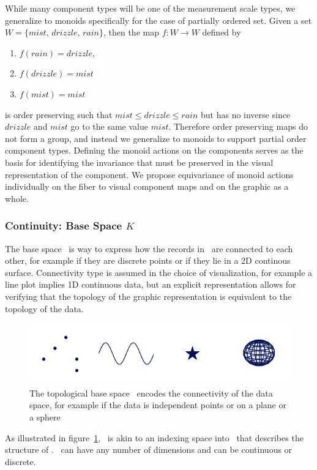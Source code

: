 \documentclass[../main.tex]{subfiles}
\begin{document}
While many component types will be one of the measurement scale types, we generalize to monoids specifically for the case of partially ordered set. Given a set $W=\{mist, \, drizzle, \, rain \}$, then the map $f: W\rightarrow W$ defined by 
\begin{enumerate}
    \item $f(rain) = drizzle$,
    \item  $f(drizzle) = mist$ 
    \item $f(mist) = mist$
\end{enumerate}
is order preserving such that $mist \leq drizzle \leq rain$ but has no inverse since $drizzle$ and $mist$ go to the same value $mist$. Therefore order preserving maps do not form a group, and instead we generalize to monoids to support partial order component types. Defining the monoid actions on the components serves as the basis for identifying the invariance\cite{kindlmann2014algebraic} that must be preserved in the visual representation of the component. We propose equivariance of monoid actions individually on the fiber to visual component maps and on the graphic as a whole.

\subsubsection{Continuity: Base Space $K$} 
\label{sec:data_base}
The base space \dbase\ is way to express how the records in \dtotal\ are connected to each other, for example if they are discrete points or if they lie in a 2D continous surface. Connectivity type is assumed in the choice of visualization, for example a line plot implies 1D continuous data, but an explicit representation allows for verifying that the topology of the graphic representation is equivalent to the topology of the data.  

\begin{figure}[H]
    \includegraphics[width=1\textwidth]{figures/math/k_different_types.png}
    \caption{The topological base space \dbase\ encodes the connectivity of the data space, for example if the data is independent points or on a plane or a sphere}
    \label{fig:base_space_types}
\end{figure}
As illustrated in figure~\ref{fig:base_space_types}, \dbase\ is akin to an indexing space into \dtotal\ that describes the structure of \dtotal.  \dbase\ can have any number of dimensions and can be continuous or discrete. 
\end{document}
